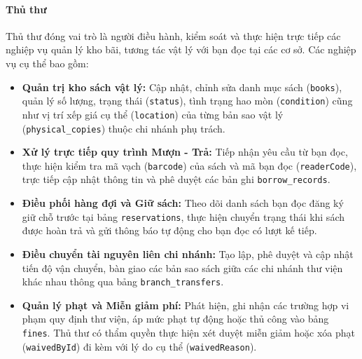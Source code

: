 \paragraph{Thủ thư}
Thủ thư đóng vai trò là người điều hành, kiểm soát và thực hiện trực tiếp các nghiệp vụ quản lý kho bãi, tương tác vật lý với bạn đọc tại các cơ sở. Các nghiệp vụ cụ thể bao gồm:
\begin{itemize}
    \item \textbf{Quản trị kho sách vật lý:} Cập nhật, chỉnh sửa danh mục sách (\texttt{books}), quản lý số lượng, trạng thái (\texttt{status}), tình trạng hao mòn (\texttt{condition}) cũng như vị trí xếp giá cụ thể (\texttt{location}) của từng bản sao vật lý (\texttt{physical\_copies}) thuộc chi nhánh phụ trách.
    \item \textbf{Xử lý trực tiếp quy trình Mượn - Trả:} Tiếp nhận yêu cầu từ bạn đọc, thực hiện kiểm tra mã vạch (\texttt{barcode}) của sách và mã bạn đọc (\texttt{readerCode}), trực tiếp cập nhật thông tin và phê duyệt các bản ghi \texttt{borrow\_records}.
    \item \textbf{Điều phối hàng đợi và Giữ sách:} Theo dõi danh sách bạn đọc đăng ký giữ chỗ trước tại bảng \texttt{reservations}, thực hiện chuyển trạng thái khi sách được hoàn trả và gửi thông báo tự động cho bạn đọc có lượt kế tiếp.
    \item \textbf{Điều chuyển tài nguyên liên chi nhánh:} Tạo lập, phê duyệt và cập nhật tiến độ vận chuyển, bàn giao các bản sao sách giữa các chi nhánh thư viện khác nhau thông qua bảng \texttt{branch\_transfers}.
    \item \textbf{Quản lý phạt và Miễn giảm phí:} Phát hiện, ghi nhận các trường hợp vi phạm quy định thư viện, áp mức phạt tự động hoặc thủ công vào bảng \texttt{fines}. Thủ thư có thẩm quyền thực hiện xét duyệt miễn giảm hoặc xóa phạt (\texttt{waivedById}) đi kèm với lý do cụ thể (\texttt{waivedReason}).
\end{itemize}

